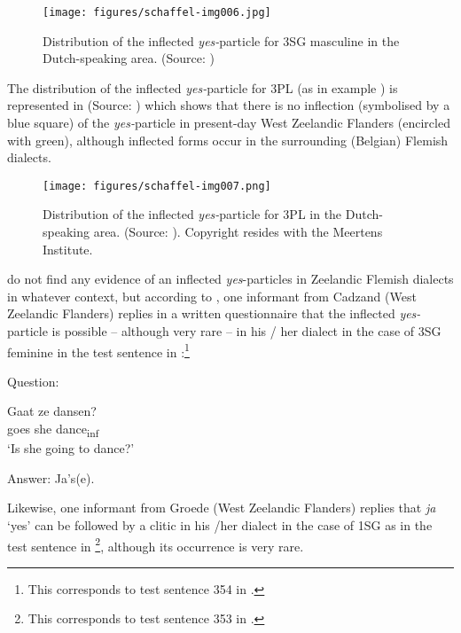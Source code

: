 \documentclass[output=paper,hidelinks,draftmode]{langscibook}
\begin{document}
\begin{figure}[t]
\texttt{[image: figures/schaffel-img006.jpg]}
\caption{Distribution of the inflected \textit{yes-}particle for 3SG masculine in the Dutch-speaking area. (Source: \citealt[161]{DeVogelaer2008})}
\label{fig:schaffel:5}
\end{figure}



The distribution of the inflected \textit{yes-}particle for 3PL (as in example ) is represented in  (Source: \citealt{Barbiers2006}) which shows that there is no inflection (symbolised by a blue square) of the \textit{yes-}particle in present-day West Zeelandic Flanders (encircled with green), although inflected forms occur in the surrounding (Belgian) Flemish dialects.


\begin{figure}
\texttt{[image: figures/schaffel-img007.png]}
\caption{Distribution of the inflected \textit{yes-}particle for 3PL in the Dutch-speaking area. (Source: \citealt{Barbiers2006}). Copyright resides with the Meertens Institute.}
	\label{fig:schaffel:6}
\end{figure}

 

\citet{DeVogelaerDevos2008} do not find any evidence of an inflected \textit{yes}{}-partic\-les in Zeelandic Flemish dialects in whatever context, but according to \citet{Barbiers2006}, one informant from Cadzand (West Zeelandic Flanders) replies in a written questionnaire that the inflected \textit{yes-}particle is possible – although very rare – in his / her dialect in the case of 3SG feminine in the test sentence in :\footnote{This corresponds to test sentence 354 in \citet{Barbiers2006}.}

\ea
\label{ex:schaffel:24}
 
\ea Question: 

\gll Gaat ze dansen?\\
goes she dance\textsubscript{inf}\\
\glt ‘Is she going to dance?’

\newpage
\ex Answer: 
{Ja’s(e).}\\

\z 
\z
 

Likewise, one informant from Groede (West Zeelandic Flanders) replies that \textit{ja} ‘yes’ can be followed by a clitic in his /her dialect in the case of 1SG as in the test sentence in \footnote{This corresponds to test sentence 353 in \citet{Barbiers2006}.}, although its occurrence is very rare.
\end{document}
